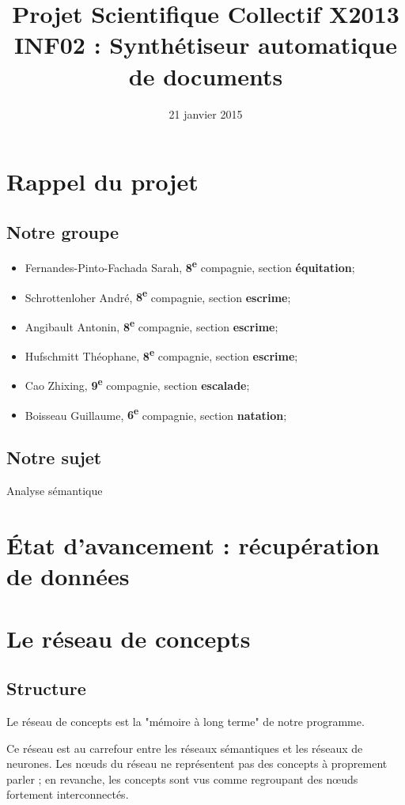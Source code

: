 \documentclass[a4paper,12pt]{article}
\title{Projet Scientifique Collectif X2013 \\INF02 : Synthétiseur automatique de documents}
\author{\membres} %
\date{21 janvier 2015}
\begin{document}
\titrelong


\tableofcontents			
\newpage

\section{Rappel du projet}

\subsection{Notre groupe}
\begin{itemize}
 \item Fernandes-Pinto-Fachada Sarah, \textbf{8\textsuperscript{e}} compagnie, section \textbf{\'equitation};
 \item Schrottenloher Andr\'e, \textbf{8\textsuperscript{e}} compagnie, section \textbf{escrime};
 \item Angibault Antonin, \textbf{8\textsuperscript{e}} compagnie, section \textbf{escrime};
 \item Hufschmitt Th\'eophane, \textbf{8\textsuperscript{e}} compagnie, section \textbf{escrime};
 \item Cao Zhixing, \textbf{9\textsuperscript{e}} compagnie, section \textbf{escalade};
 \item Boisseau Guillaume, \textbf{6\textsuperscript{e}} compagnie, section \textbf{natation};
\end{itemize}

\subsection{Notre sujet}
Analyse s\'emantique

\section{\'Etat d'avancement : r\'ecup\'eration de donn\'ees}

\section{Le r\'eseau de concepts}


\subsection{Structure}


\begin{definition}
Le réseau de concepts est la "mémoire à long terme" de notre programme.

Ce réseau est au carrefour entre les réseaux sémantiques et les réseaux de neurones. Les n\oe uds du réseau ne représentent pas des concepts à proprement parler ; en revanche, les concepts sont vus comme regroupant des n\oe uds fortement interconnectés.
\end{definition}
\end{document}

